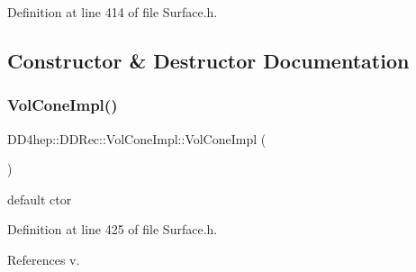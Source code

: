 Definition at line 414 of file Surface.\+h.



\subsection{Constructor \& Destructor Documentation}
\hypertarget{class_d_d4hep_1_1_d_d_rec_1_1_vol_cone_impl_a53aac2e0c112ae12be098853a5b93d64}{}\label{class_d_d4hep_1_1_d_d_rec_1_1_vol_cone_impl_a53aac2e0c112ae12be098853a5b93d64} 
\subsubsection{\texorpdfstring{Vol\+Cone\+Impl()}{VolConeImpl()}\hspace{0.1cm}{\footnotesize\ttfamily [1/2]}}
{\footnotesize\ttfamily D\+D4hep\+::\+D\+D\+Rec\+::\+Vol\+Cone\+Impl\+::\+Vol\+Cone\+Impl (\begin{DoxyParamCaption}{ }\end{DoxyParamCaption})\hspace{0.3cm}{\ttfamily [inline]}}



default c\textquotesingle{}tor 



Definition at line 425 of file Surface.\+h.



References v.

\hypertarget{class_d_d4hep_1_1_d_d_rec_1_1_vol_cone_impl_acdcb9ac446fc79054df650fa90a0d381}{}\label{class_d_d4hep_1_1_d_d_rec_1_1_vol_cone_impl_acdcb9ac446fc79054df650fa90a0d381} 
